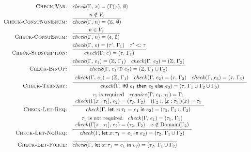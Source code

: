 \documentclass[peerreview, 10pt]{IEEEtran}
\newcommand{\Z}{\ensuremath{\mathbb{Z}}}
\newcommand{\lett}[4]{\ensuremath{\mathsf{let}\ #1\mathsf{:}\,#2\ \mathsf{=}\ #3\ \mathsf{in}\ #4}}
\newcommand{\binop}[2]{\ensuremath{#1\ \mathsf{\oplus}\ #2}}
\newcommand{\ternary}[3]{\ensuremath{\mathsf{if0}\ #1\ \mathsf{then}\ #2\ \mathsf{else}\ #3}}
\newcommand{\checktype}[4]{\ensuremath{{check}(#1,\,#2)=(#3,\,#4)}}
\newcommand{\requiretype}[4]{\ensuremath{{require}(#1,\,#2,\,#3)=#4}}
\newcommand{\required}[1]{\ensuremath{#1\text{ is required}}}
\newcommand{\nrequired}[1]{\ensuremath{#1\text{ is not required}}}
\begin{document}
\begin{figure*}[ht]
\normalsize
\centering
\begin{framed}
\begin{align*}
\text{\textsc{Check-Var:}} &\quad \checktype{\Gamma}{x}{\Gamma(x)}{\emptyset} \\
\text{\textsc{Check-ConstNonEnum:}} &\quad \infer{\checktype{\Gamma}{n}{\Z}{\emptyset}}{n \notin V_\epsilon} \\
\text{\textsc{Check-ConstEnum:}} &\quad \infer{\checktype{\Gamma}{n}{\epsilon}{\emptyset}}{n \in V_\epsilon} \\
\text{\textsc{Check-Subsumption:}} &\quad \infer{\checktype{\Gamma}{e}{\tau}{\Gamma_1}}{\checktype{\Gamma}{e}{\tau'}{\Gamma_1} \quad \tau' <: \tau} \\
\text{\textsc{Check-BinOp:}} &\quad \infer{\checktype{\Gamma}{\binop{e_1}{e_2}}{\Z}{\Gamma_1 \cup \Gamma_2}}{\checktype{\Gamma}{e_1}{\Z}{\Gamma_1} \quad \checktype{\Gamma}{e_2}{\Z}{\Gamma_2}} \\
\text{\textsc{Check-Ternary:}} &\quad \infer{\checktype{\Gamma}{\ternary{e_1}{e_2}{e_3}}{\tau}{\Gamma_1 \cup \Gamma_2 \cup \Gamma_3}}{
\begin{array}{c}
\checktype{\Gamma}{e_1}{\Z}{\Gamma_1} \quad
\checktype{\Gamma}{e_2}{\tau}{\Gamma_2} \quad \checktype{\Gamma}{e_3}{\tau}{\Gamma_3}
\end{array}
} \\
\text{\textsc{Check-Let-Req:}} &\quad \infer{\checktype{\Gamma}{\lett{x}{\tau_1}{e_1}{e_2}}{\tau_2}{\Gamma_1 \cup \Gamma_2}}{
\begin{array}{c}
\required{\tau_1} \quad \requiretype{\Gamma}{e_1}{\tau_1}{\Gamma_1} \\
\checktype{\Gamma[x:\tau_1]}{e_2}{\tau_2}{\Gamma_2}\quad
(\Gamma_2\cup[x:\tau_1])(x)=\tau_1
\end{array}
} \\
\text{\textsc{Check-Let-NoReq:}} &\quad \infer{\checktype{\Gamma}{\lett{x}{\tau_1}{e_1}{e_2}}{\tau_2}{\Gamma_1 \cup \Gamma_2}}{
\begin{array}{c}
\nrequired{\tau_1} \quad \checktype{\Gamma}{e_1}{\tau_1}{\Gamma_1} \\
\checktype{\Gamma[x:\tau_1]}{e_2}{\tau_2}{\Gamma_2} \quad x \notin \text{Domain}(\Gamma_2)
\end{array}
} \\
\text{\textsc{Check-Let-Force:}} &\quad \infer{\checktype{\Gamma}{\lett{x}{\tau_1}{e_1}{e_2}}{\tau_2}{\Gamma_1 \cup \Gamma_2}}{
\begin{array}{c}

\end{array}}
\end{align*}
\end{framed}
\end{figure*}
\end{document}
